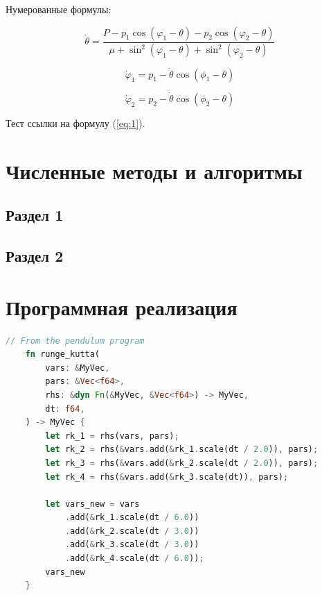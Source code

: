 \documentclass[14pt,oneside]{extarticle}
\begin{document}
Нумерованные формулы:

\begin{equation}
\label{eq:1}
    \dot{\theta}=\frac{P-p_{1}\cos\left(\varphi_{1}-\theta\right)-p_{2}\cos\left(\varphi_{2}-\theta\right)}{\mu+\sin^{2}\left(\varphi_{1}-\theta\right)+\sin^{2}\left(\varphi_{2}-\theta\right)}
\end{equation}

\begin{equation}
    \dot{\varphi}_{1}=p_{1}-\dot{\theta}\cos(\phi_{1}-\theta)
\end{equation}

\begin{equation}
    \dot{\varphi}_{2}=p_{2}-\dot{\theta}\cos(\phi_{2}-\theta)
\end{equation}

Тест ссылки на формулу (\ref{eq:1}).

\pagebreak
\section{Численные методы и алгоритмы}

\subsection{Раздел 1}

\subsection{Раздел 2}

\pagebreak
\section{Программная реализация}

\begin{lstlisting}[language=rust,caption={Программная реализация метода Рунге-Кутты},label={listing-1}]
    // From the pendulum program
    fn runge_kutta(
        vars: &MyVec,
        pars: &Vec<f64>,
        rhs: &dyn Fn(&MyVec, &Vec<f64>) -> MyVec,
        dt: f64,
    ) -> MyVec {
        let rk_1 = rhs(vars, pars);
        let rk_2 = rhs(&vars.add(&rk_1.scale(dt / 2.0)), pars);
        let rk_3 = rhs(&vars.add(&rk_2.scale(dt / 2.0)), pars);
        let rk_4 = rhs(&vars.add(&rk_3.scale(dt)), pars);
    
        let vars_new = vars
            .add(&rk_1.scale(dt / 6.0))
            .add(&rk_2.scale(dt / 3.0))
            .add(&rk_3.scale(dt / 3.0))
            .add(&rk_4.scale(dt / 6.0));
        vars_new
    }
    \end{lstlisting}
    
\end{document}
